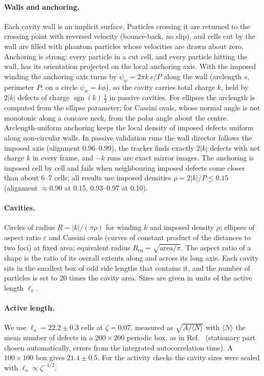 \documentclass[aps,prl,onecolumn,superscriptaddress,amsmath,amssymb,nofootinbib]{revtex4-2}
\newcommand{\half}{\tfrac12}
\newcommand{\la}{\ell_a}
\begin{document}
\paragraph{Walls and anchoring.} Each cavity wall is an implicit surface. Particles crossing it are returned to the crossing point with reversed velocity
(bounce-back, no slip), and cells cut by the wall are filled with phantom particles whose velocities are drawn about zero. Anchoring is strong: every particle
in a cut cell, and every particle hitting the wall, has its orientation projected on the local anchoring axis. With the imposed winding the anchoring axis turns
by $\psi_w=2\pi k\,s/P$ along the wall (arclength $s$, perimeter $P$; on a circle $\psi_w=k\phi$), so the cavity carries total charge $k$, held by $2|k|$
defects of charge $\operatorname{sgn}(k)\,\half$ in passive cavities. For ellipses the arclength is computed from the ellipse parameter; for Cassini ovals, whose
normal angle is not monotonic along a concave neck, from the polar angle about the centre. Arclength-uniform anchoring keeps the local density of imposed defects
uniform along non-circular walls. In passive validation runs the wall director follows the imposed axis (alignment 0.96--0.99), the tracker finds exactly
$2|k|$ defects with net charge $k$ in every frame, and $-k$ runs are exact mirror images. The anchoring is imposed cell by cell and fails when neighbouring
imposed defects come closer than about 6--7 cells; all results use imposed densities $\rho=2|k|/P\le0.15$ (alignment $\approx0.90$ at 0.15, 0.93--0.97 at 0.10).

\paragraph{Cavities.} Circles of radius $R=|k|/(\pi\rho)$ for winding $k$ and imposed density $\rho$; ellipses of aspect ratio $\varepsilon$ and Cassini ovals
(curves of constant product of the distances to two foci) at fixed area; equivalent radius $R_\mathrm{eq}=\sqrt{\mathrm{area}/\pi}$. The aspect ratio of a shape is
the ratio of its overall extents along and across its long axis. Each cavity sits in the smallest box of odd side lengths that contains it, and the number of
particles is set to 20 times the cavity area. Sizes are given in units of the active length $\la$.

\paragraph{Active length.} We use $\la=22.2\pm0.3$ cells at $\zeta=0.07$, measured as $\sqrt{A/\langle N\rangle}$ with $\langle N\rangle$ the mean number of defects in a
$200\times200$ periodic box, as in Ref.~\cite{Kozhukhov2024} (stationary part chosen automatically, errors from the integrated autocorrelation time).
A $100\times100$ box gives $21.4\pm0.5$. For the activity checks the cavity sizes were scaled with $\la\propto\zeta^{-1/2}$.
\end{document}
